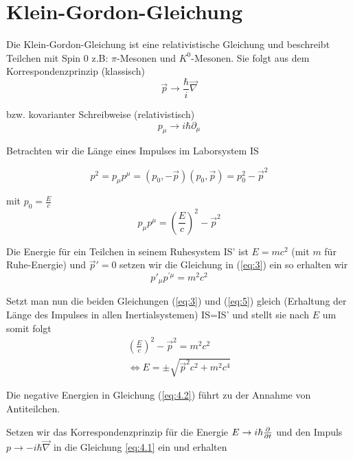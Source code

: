 
 



\section*{Klein-Gordon-Gleichung}


Die Klein-Gordon-Gleichung ist eine relativistische Gleichung und beschreibt Teilchen mit Spin 0 z.B: \(\pi\)-Mesonen und \(K^0\)-Mesonen. Sie folgt aus dem Korrespondenzprinzip (klassisch)
\begin{equation}
  \label{eq:1}
  \vec p \rightarrow \frac{\hbar}{i}\vec\nabla 
\end{equation}

bzw. kovarianter Schreibweise (relativistisch)
\begin{equation}
  \label{eq:2}
  p_\mu \rightarrow i\hbar \partial_\mu
\end{equation}

Betrachten wir die Länge eines Impulses im Laborsystem IS

\[p^2 = p_\mu p^\mu = (p_0,-\vec p) (p_0,\vec p) =  p_0^2 -\vec p^2\]

mit \(p_0 = \frac{E}{c}\) 
\begin{equation}
  \label{eq:3}
  p_\mu p^\mu =  \left( \frac{E}{c}\right)^2 -\vec p^2
\end{equation}


Die Energie für ein Teilchen in seinem Ruhesystem IS' ist \(E=mc^2\) (mit \(m\) für Ruhe-Energie) und \(\vec p' = 0\) setzen wir die Gleichung in (\ref{eq:3}) ein so erhalten wir
\begin{equation}
  \label{eq:5}
   p'_\mu p^{'\mu} = m^2c^2
\end{equation}

Setzt man nun die beiden Gleichungen (\ref{eq:3}) und (\ref{eq:5}) gleich (Erhaltung der Länge des Impulses in allen Inertialsystemen) IS=IS'  und stellt sie nach \(E\) um somit folgt
\begin{align}
  \left( \frac{E}{c}\right)^2 -\vec p^2  = m^2c^2    \label{eq:4.1} \\
\Leftrightarrow E = \pm \sqrt{\vec p^2c^2 + m^2c^4}  \label{eq:4.2}
\end{align}

Die negative Energien in Gleichung (\ref{eq:4.2}) führt zu der Annahme von Antiteilchen.

Setzen wir das Korrespondenzprinzip für die Energie \(E \to i\hbar\pdiff_t \) und den Impuls \(p \to -i\hbar \vec\nabla\) in die Gleichung \eqref{eq:4.1} ein und erhalten


